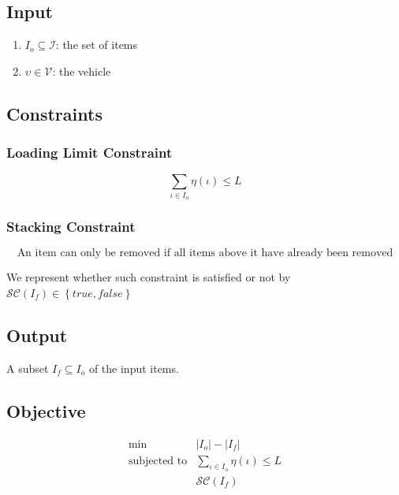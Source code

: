 \documentclass{article}
\newcommand{\true}{\ensuremath{true}\xspace}
\newcommand{\false}{\ensuremath{false}\xspace}
\newcommand{\subjectedTo}{\ensuremath{\mbox{subjected to}}\xspace}
\newcommand{\abs}[1]{\ensuremath{\left| #1 \right|}\xspace}
\newcommand{\Set}[1]{\ensuremath{\left\{#1\right\}}}
\newcommand{\vehicleO}{\ensuremath{\upsilon}\xspace}
\newcommand{\vehicleSet}{\mathcal{V}\xspace}
\newcommand{\loadingFunction}{\ensuremath{\eta}\xspace}
\newcommand{\loadingFunctionApply}[1]{\loadingFunction \left( #1 \right)\xspace}
\newcommand{\loadingLimit}{\ensuremath{L}\xspace}
\newcommand{\itemO}{\ensuremath{\iota}\xspace}
\newcommand{\itemSet}{\ensuremath{\mathcal{I}}\xspace}
\newcommand{\itemInput}{\ensuremath{\mathit{I}_{o}}\xspace}
\newcommand{\itemOutput}{\ensuremath{\mathit{I}_{f}}\xspace}
\newcommand{\stackingPredicateSymbol}{\ensuremath{\mathcal{SC}}\xspace}
\newcommand{\stackingPredicate}[1]{\ensuremath{\stackingPredicateSymbol \left( #1 \right)}\xspace}
\newcommand{\vehicleInput}{\vehicleO}
\begin{document}
\subsection{Input}

\begin{enumerate}
	\item $\itemInput \subseteq \itemSet$: the set of items
	\item $\vehicleInput \in \vehicleSet$: the vehicle
\end{enumerate}

\subsection{Constraints}

\subsubsection*{Loading Limit Constraint}
\begin{equation}
	\label{constraint:loading-limit}
	\displaystyle\sum\limits_{\itemO \in \itemInput}
		\loadingFunctionApply{\itemO}
		\leq \loadingLimit
\end{equation}

\subsubsection*{Stacking Constraint}
\begin{equation}
	\label{constraint:stacking}
	\mbox{An item can only be removed if all items above it have already been removed}
\end{equation}

We represent whether such constraint is satisfied or not by $\stackingPredicate{\itemOutput} \in \Set{\true, \false}$

\subsection{Output}

A subset $\itemOutput \subseteq \itemInput$ of the input items.

\subsection{Objective}

\begin{eqnarray}
	\label{problem:items-removal}
	\min & \abs{\itemInput} - \abs{\itemOutput} \\
	\subjectedTo
		& \displaystyle\sum\limits_{\itemO \in \itemInput}
			\loadingFunctionApply{\itemO}
			\leq \loadingLimit \nonumber\\
		& \stackingPredicate{\itemOutput} \nonumber
\end{eqnarray}
\end{document}
